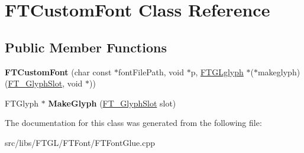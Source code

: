 \hypertarget{class_f_t_custom_font}{
\section{FTCustomFont Class Reference}
\label{class_f_t_custom_font}
}
\subsection*{Public Member Functions}
\begin{DoxyCompactItemize}
\item 
\hypertarget{class_f_t_custom_font_a752e3adba12661605536402b55381aa8}{
{\bfseries FTCustomFont} (char const $\ast$fontFilePath, void $\ast$p, \hyperlink{struct___f_t_g_lglyph}{FTGLglyph} $\ast$($\ast$makeglyph)(\hyperlink{struct_f_t___glyph_slot_rec__}{FT\_\-GlyphSlot}, void $\ast$))}
\label{class_f_t_custom_font_a752e3adba12661605536402b55381aa8}

\item 
\hypertarget{class_f_t_custom_font_a14863f6c098d220681087ff85f004dff}{
FTGlyph $\ast$ {\bfseries MakeGlyph} (\hyperlink{struct_f_t___glyph_slot_rec__}{FT\_\-GlyphSlot} slot)}
\label{class_f_t_custom_font_a14863f6c098d220681087ff85f004dff}

\end{DoxyCompactItemize}


The documentation for this class was generated from the following file:\begin{DoxyCompactItemize}
\item 
src/libs/FTGL/FTFont/FTFontGlue.cpp\end{DoxyCompactItemize}
